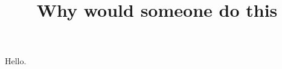 \documentclass{article}
\title{\LARGE \bf
  Why would someone do this
}
\begin{document}
  \maketitle
  Hello.
\end{document}
